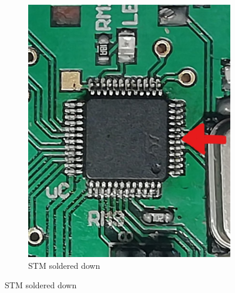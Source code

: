 \begin{figure}[H]
\begin{minipage}[b]{0.45\textwidth}
\begin{figure}[H]
        \includegraphics[width=1\textwidth]{Solder_micro.jpg}
        \vspace{-2mm}
        \caption{STM soldered down}
    \end{figure}
  \end{minipage}
\end{figure}





